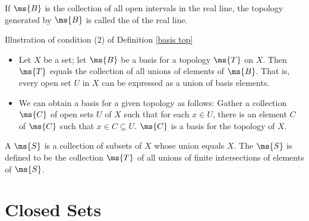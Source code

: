 \begin{example}If $\ms{B}$ is the collection of all open 
intervals in the real line, the topology generated by $\ms{B}$ is 
called the  of the real line.
\end{example}

\begin{marginfigure}
	\centering
	\caption{Illustration of condition (2) of Definition 
		\ref{basis top}}\label{cond 2 fig}
\end{marginfigure}

\begin{itemize}
	\item Let $X$ be a set; let $\ms{B}$ be a basis for a 
	topology $\ms{T}$ on $X$. Then $\ms{T}$ equals the collection 
	of all unions of elements of $\ms{B}$. That is, every open 
	set $U$ in $X$ can be expressed as a union of basis elements.
	
	\item We can obtain a basis for a given topology as follows: 
	Gather a collection $\ms{C}$ of open sets $U$ of $X$ such 
	that for each $x \in U$, there is an element $C$ of $\ms{C}$ 
	such that $x \in C \subseteq U$. $\ms{C}$ is a basis for the 
	topology of $X$.
\end{itemize}

	A  $\ms{S}$ is a 
	collection of subsets of $X$ whose union equals $X$. The 
	 $\ms{S}$ is defined 
	to be the collection $\ms{T}$ of all unions of finite 
	intersections of elements of $\ms{S}$.
	


\newpage

\section{Closed Sets}

